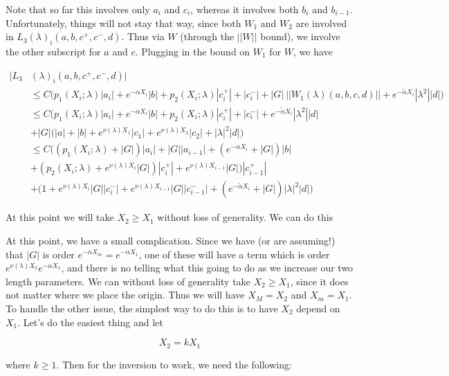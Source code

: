 \documentclass[12pt]{article}
\begin{document}
\begin{enumerate}
Note that so far this involves only $a_i$ and $c_i$, whereas it involves both $b_i$ and $b_{i-1}$. Unfortunately, things will not stay that way, since both $W_1$ and $W_2$ are involved in $L_3(\lambda)_i(a, b, c^+, c^-, d)$. Thus via $W$ (through the $||W||$ bound), we involve the other subscript for $a$ and $c$. Plugging in the bound on $W_1$ for $W$, we have

\begin{align*}
|L_3&(\lambda)_i(a, b, c^+, c^-, d)| \\
&\leq C \Big( p_1(X_i; \lambda)|a_i|
+ e^{-\alpha X_i}|b| + p_2(X_i; \lambda)|c_i^+| + |c_i^-| + |G|\:||W_1(\lambda)(a,b,c,d)|| + e^{-\tilde{\alpha} X_i} |\lambda^2| |d| \Big) \\
& \leq C \Big( p_1(X_i; \lambda)|a_i|
+ e^{-\alpha X_i}|b| + p_2(X_i; \lambda)|c_i^+| + |c_i^-| + e^{-\tilde{\alpha} X_i} |\lambda^2| |d| \\
&+ |G| (|a| + |b| + e^{\nu(\lambda)X_1}|c_1| + e^{\nu(\lambda)X_2}|c_2| + |\lambda|^2 |d| \Big) \\
& \leq C \Big( (p_1(X_i; \lambda) + |G|)|a_i| + |G||a_{i-1}| + (e^{-\alpha X_i} + |G|) |b| \\
&+ ( p_2(X_i; \lambda) + e^{\nu(\lambda)X_i} |G|) |c_i^+| + e^{\nu(\lambda)X_{i-1}} |G|) |c_{i-1}^+|   \\
&+ (1 + e^{\nu(\lambda)X_i} |G||c_i^-| + e^{\nu(\lambda)X_{i-1}} |G||c_{i-1}^-| + (e^{-\tilde{\alpha} X_i} + |G|) |\lambda|^2 |d| \Big)
\end{align*} 

At this point we will take $X_2 \geq X_1$ without loss of generality. We can do this 

At this point, we have a small complication. Since we have (or are assuming!) that $|G|$ is order $e^{-\alpha X_m} = e^{-\alpha X_1}$, one of these will have a term which is order $e^{\nu(\lambda)X_2} e^{-\alpha X_1}$, and there is no telling what this going to do as we increase our two length parameters. We can without loss of generality take $X_2 \geq X_1$, since it does not matter where we place the origin. Thus we will have $X_M = X_2$ and $X_m = X_1$. To handle the other issue, the simplest way to do this is to have $X_2$ depend on $X_1$. Let's do the easiest thing and let

\[
X_2 = k X_1
\]

where $k \geq 1$. Then for the inversion to work, we need the following:


\end{enumerate}
\end{document}
